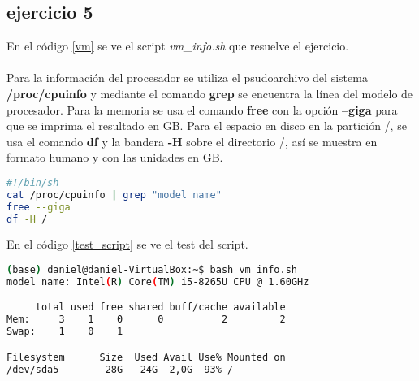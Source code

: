 \subsection*{ejercicio 5}
%
En el código \ref{vm} se ve el script \textit{vm\_info.sh} que resuelve el ejercicio.\\\\
Para la información del procesador se utiliza el psudoarchivo del sistema \textbf{/proc/cpuinfo} y mediante el comando \textbf{grep} se encuentra la línea del modelo de procesador. Para la memoria se usa el comando \textbf{free} con la opción \textbf{--giga} para que se imprima el resultado en GB. Para el espacio en disco en la partición /, se usa el comando \textbf{df} y la bandera \textbf{-H} sobre el directorio /, así se muestra en formato humano y con las unidades en GB.
\begin{lstlisting}[language=bash,caption={Script de información de la máquina virtual}, label={vm}]
#!/bin/sh
cat /proc/cpuinfo | grep "model name"
free --giga
df -H / 
\end{lstlisting}
En el código \ref{test_script} se ve el test del script.
\begin{lstlisting}[language=bash,caption={Test de vm\_info.sh}, label={test_script}]
(base) daniel@daniel-VirtualBox:~$ bash vm_info.sh
model name: Intel(R) Core(TM) i5-8265U CPU @ 1.60GHz

     total used free shared buff/cache available
Mem:     3    1    0      0          2         2
Swap:    1    0    1

Filesystem      Size  Used Avail Use% Mounted on
/dev/sda5        28G   24G  2,0G  93% /
\end{lstlisting}
